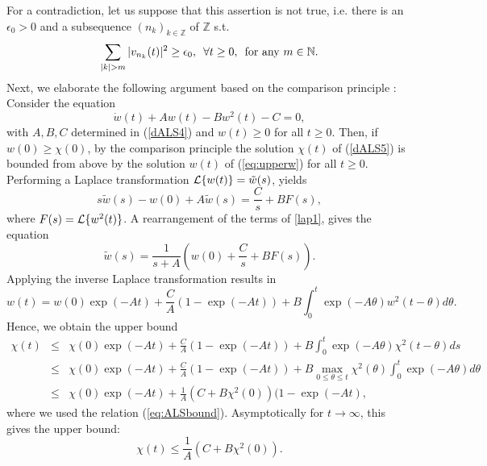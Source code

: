 \documentclass[preprintnumbers,amsmath,amssymb]{revtex4}
\begin{document}
 For a contradiction, let us suppose that this assertion 
is not true, 
i.e. there is an $\epsilon_0>0$ and a subsequence $(n_k)_{k \in {\mathbb{Z}}}$ of $\mathbb{Z}$ s.t.
\begin{equation}
 \sum_{|k|>m}|v_{n_k}(t)|^2 \ge \epsilon_0,\,\,\,\forall t\ge 0,\,\,\,{\rm for\,\, any}\,\, m\in {\mathbb{N}}.\label{eq:epsilon0}
\end{equation}
Next, we elaborate the following argument based on the comparison principle \cite{McNabb1986}: Consider the equation
\begin{equation}
 \dot{w}(t)+Aw(t)-Bw^2(t)-C=0,\label{eq:upperw}
\end{equation}
with $A,B,C$ determined in (\ref{dALS4}) and $w(t)\ge 0$ for all $t\ge 0$.
Then, if $w(0)\ge\chi(0)$, by the comparison principle the solution $\chi (t)$ of (\ref{dALS5}) is bounded from above by the solution $w(t)$ of (\ref{eq:upperw}) for all 
$t \ge 0$.
Performing a Laplace transformation 
${\cal{L}}\{w(t)\}=\tilde{w}(s)$, yields
\begin{equation}
\label{lap1}
 s \tilde{w}(s)-w(0)+A \tilde{w}(s)=\frac{C}{s}+B F(s), 
\end{equation}
where $F(s)={\cal{L}}\{w^2(t)\}$. A rearrangement of the terms of \eqref{lap1}, gives the equation
\begin{equation}
 \tilde{w}(s)=\frac{1}{s+A}\left(w(0)+\frac{C}{s}+BF(s)\right).
\end{equation}
Applying the inverse Laplace transformation results in 
\begin{equation}
 w(t)=w(0)\exp(-At)+\frac{C}{A}\left(1-\exp(-At)\right)+B\int_0^t\exp(-A\theta)w^2(t-\theta)d\theta.
\end{equation}
Hence, we obtain the upper bound
\begin{eqnarray}
 \chi(t)&\le& \chi(0)\exp(-At)+\frac{C}{A}\left(1-\exp(-At)\right)+B\int_0^t\exp(-A\theta)\chi^2(t-\theta)ds\nonumber\\
 &\le& \chi(0)\exp(-At)+\frac{C}{A}\left(1-\exp(-At)\right)+B\max_{0\le \theta\le t}\chi^2(\theta)\int_0^t\exp(-A\theta)d\theta\nonumber\\
 &\le& \chi(0)\exp(-At)+\frac{1}{A}(C+B\chi^2(0))(1-\exp(-At),
\end{eqnarray}
where we used the relation (\ref{eq:ALSbound}). Asymptotically for $t\rightarrow \infty$, this gives the upper bound:
\begin{equation}
 \chi(t) \le \frac{1}{A}(C+B\chi^2(0)).\label{eq:upperchi}
\end{equation}
\end{document}
